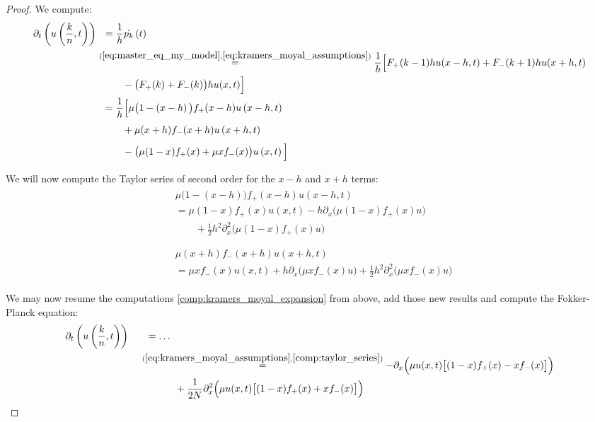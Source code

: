 \documentclass[12pt,a4paper,twoside]{article}
\begin{document}
\begin{proof}
	We compute:
	\begin{align}\label{comp:kramers_moyal_expansion}
	\begin{split}
	\partial_t \left(u\left(\frac{k}{n}, t\right)\right) &\phantom{ll}= \frac{1}{h}\dot{p_k}\left(t\right)\\
	&\overset{(\ref{eq:master_eq_my_model},\ref{eq:kramers_moyal_assumptions})}{=} \frac{1}{h}\Big[F_+(k-1)hu(x-h,t) + F_-(k+1)hu(x+h,t)\Big.\\
	&\qquad\Big. \phantom{ll}- \big(F_+(k)+F_-(k)\big)hu(x,t)\Big]\\
	&\phantom{ll}= \frac{1}{h}\Big[\mu\big(1-\left(x-h\right)\big) f_+(x-h)  u\left(x-h,t \right)\Big.\\
	&\qquad\Big. \phantom{ll}+ \mu(x+h) f_-(x+h) u\left(x+h,t\right)\Big.\\
	&\qquad\Big. \phantom{ll}- \big(\mu(1-x) f_+(x) + \mu x f_-(x)\big) u\left(x,t\right)\Big] 
	\end{split}
	\end{align}
	
	We will now compute the Taylor series of second order for the $x-h$ and $x+h$ terms:
	\begin{align}\label{comp:taylor_series}
	\begin{split}
	&\mu\big(1-(x-h)\big) f_+(x-h)  u\left(x-h,t \right)\\
	&= \mu(1-x)f_+(x) u\left(x,t\right) - h\partial_x \big(\mu(1-x)f_+(x)u\big)\\
	&\qquad +\frac{1}{2}h^2\partial^2_x\big(\mu(1-x)f_+(x)u\big)\\
	&\\
	&\\
	&\mu(x+h) f_-(x+h)  u\left(x+h,t\right)\\
	&= \mu x f_-(x)u(x,t) + h\partial_x \big(\mu x f_-(x) u\big) + \frac{1}{2}h^2\partial^2_x\big(\mu xf_-(x) u\big)
	\end{split}
	\end{align}
	
	We may now resume the computations \eqref{comp:kramers_moyal_expansion} from above, add those new results and compute the Fokker-Planck equation:
	\begin{align}
	\begin{split}\label{eq:fokker_planck}
	\partial_t \left(u\left(\frac{k}{n}, t\right)\right)\phantom{lll} &\phantom{ll}= \dots \\
	&\overset{(\ref{eq:kramers_moyal_assumptions}, \ref{comp:taylor_series})}{=} -\partial_x\Big(\mu u(x,t)\big[(1-x)f_+(x) - xf_-(x)\big]\Big)\\
	&\qquad\phantom{lllll} + \frac{1}{2N} \partial^2_x\Big(\mu u(x,t)\big[(1-x)f_+(x) + xf_-(x)\big]\Big)\\
	\end{split}
	\end{align}
	

\end{proof}
\end{document}
